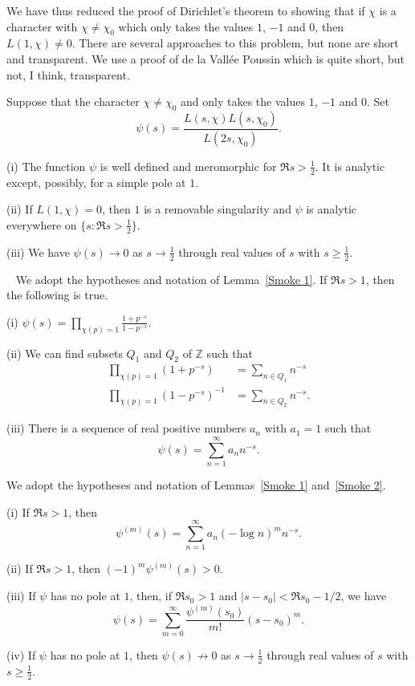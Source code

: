 We have thus reduced the proof of Dirichlet's theorem
to showing that if  $\chi$ is a character
with $\chi\neq \chi_{0}$ which only
takes the values $1$, $-1$ and $0$, then $L(1,\chi)\neq 0$.
There are several approaches to this problem, but
none are short and transparent. We use a proof
of de la Vall{\'{e}}e Poussin which is quite short,
but not, I think, transparent.
\begin{lemma}\label{Smoke 1} Suppose that the
character $\chi\neq \chi_{0}$ and only
takes the values $1$, $-1$ and $0$. Set
\[\psi(s)=\frac{L(s,\chi)L(s,\chi_{0})}{L(2s,\chi_{0})}.\]

(i) The function $\psi$ is well defined and meromorphic
for $\Re s>\frac{1}{2}$. It is analytic except, possibly,
for a simple pole at $1$.

(ii) If  $L(1,\chi)=0$, then $1$ is a removable singularity
and $\psi$ is analytic everywhere on $\{s:\Re s>\frac{1}{2}\}$.

(iii) We have $\psi(s)\rightarrow 0$ as $s\rightarrow \frac{1}{2}$
through real values of $s$ with $s\geq \frac{1}{2}$.
\end{lemma}
\begin{lemma}~\label{Smoke 2}
We adopt the hypotheses and notation of
Lemma~\ref{Smoke 1}. If $\Re s>1$, then the following is true.

(i) ${\displaystyle
\psi(s)=\prod_{\chi(p)=1}\frac{1+p^{-s}}{1-p^{-s}}.}$

(ii) We can find subsets $Q_{1}$ and $Q_{2}$ of $\mathbb{Z}$
such that
\begin{align*}
\prod_{\chi(p)=1}(1+p^{-s})&=\sum_{n\in Q_{1}}n^{-s}\\
\prod_{\chi(p)=1}(1-p^{-s})^{-1}&=\sum_{n\in Q_{2}}n^{-s}.
\end{align*}

(iii) There is a sequence of real positive numbers $a_{n}$
with $a_{1}=1$ such that
\[\psi(s)=\sum_{n=1}^{\infty}a_{n}n^{-s}.\]
\end{lemma}
\begin{lemma} We adopt the hypotheses and notation of
Lemmas~\ref{Smoke 1} and~\ref{Smoke 2}.

(i) If $\Re s>1$, then
\[\psi^{(m)}(s)=\sum_{n=1}^{\infty}a_{n}(-\log n)^{m}n^{-s}.\]

(ii) If $\Re s>1$, then $(-1)^{m}\psi^{(m)}(s)>0$.

(iii) If $\psi$ has no pole at $1$, then, if $\Re s_{0}>1$
and $|s-s_{0}|<\Re s_{0}-1/2$, we have
\[\psi(s)=\sum_{m=0}^{\infty}
\frac{\psi^{(m)}(s_{0})}{m!}(s-s_{0})^{m}.\]

(iv) If $\psi$ has no pole at $1$, then
$\psi(s)\nrightarrow 0$ as $s\rightarrow \frac{1}{2}$
through real values of $s$ with $s\geq \frac{1}{2}$.
\end{lemma}

